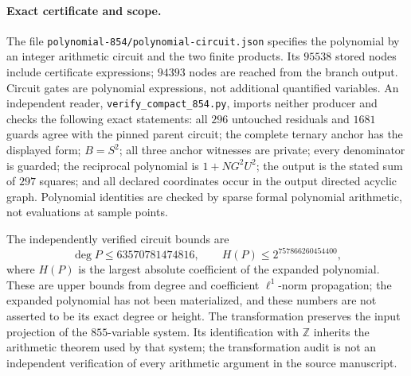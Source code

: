 \paragraph{Exact certificate and scope.}
The file \texttt{polynomial-854/polynomial-circuit.json} specifies the
polynomial by an integer arithmetic circuit and the two finite products.
Its $95538$ stored nodes include certificate expressions; $94393$ nodes
are reached from the branch output. Circuit gates are polynomial
expressions, not additional quantified variables. An independent
reader, \texttt{verify\_compact\_854.py}, imports neither producer and
checks the following exact statements: all $296$ untouched residuals
and $1681$ guards agree with the pinned parent circuit; the complete
ternary anchor has the displayed form; $B=S^2$; all three anchor
witnesses are private; every denominator is guarded; the reciprocal
polynomial is $1+NG^2U^2$; the output is the stated sum of $297$
squares; and all declared coordinates occur in the output directed
acyclic graph. Polynomial identities are checked by sparse formal
polynomial arithmetic, not evaluations at sample points.

The independently verified circuit bounds are
\[
 \deg P\le63570781474816,
 \qquad H(P)\le2^{757866260454400},
\]
where $H(P)$ is the largest absolute coefficient of the expanded
polynomial. These are upper bounds from degree and coefficient
$\ell^1$-norm propagation; the expanded polynomial has not been
materialized, and these numbers are not asserted to be its exact
degree or height. The transformation preserves the input projection
of the $855$-variable system. Its identification with $\mathbb Z$
inherits the arithmetic theorem used by that system; the transformation
audit is not an independent verification of every arithmetic argument
in the source manuscript.
